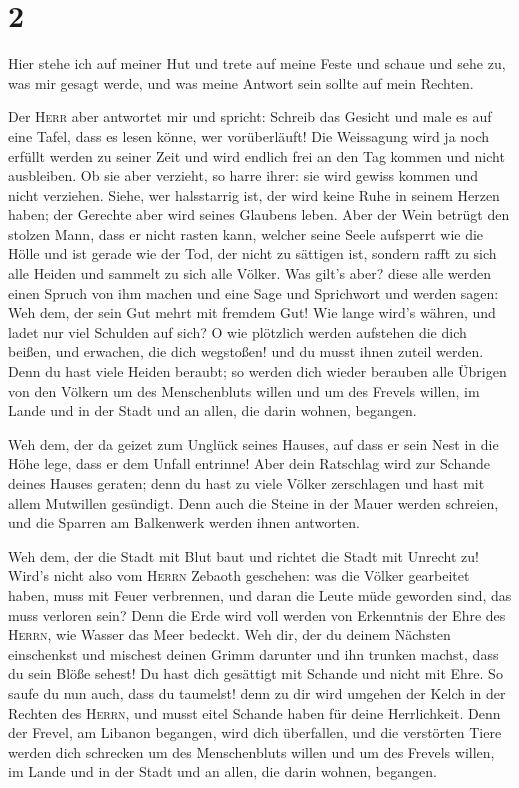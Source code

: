 \hypertarget{section-1}{%
\section{2}\label{section-1}}

 Hier stehe ich auf meiner Hut und trete auf meine Feste
und schaue und sehe zu, was mir gesagt werde, und was meine Antwort sein
sollte auf mein Rechten.

 Der \textsc{Herr} aber antwortet mir und spricht: Schreib
das Gesicht und male es auf eine Tafel, dass es lesen könne, wer
vorüberläuft!  Die Weissagung wird ja noch erfüllt werden
zu seiner Zeit und wird endlich frei an den Tag kommen und nicht
ausbleiben. Ob sie aber verzieht, so harre ihrer: sie wird gewiss kommen
und nicht verziehen.  Siehe, wer halsstarrig ist, der wird
keine Ruhe in seinem Herzen haben; der Gerechte aber wird seines
Glaubens leben.  Aber der Wein betrügt den stolzen Mann,
dass er nicht rasten kann, welcher seine Seele aufsperrt wie die Hölle
und ist gerade wie der Tod, der nicht zu sättigen ist, sondern rafft zu
sich alle Heiden und sammelt zu sich alle Völker.  Was
gilt's aber? diese alle werden einen Spruch von ihm machen und eine Sage
und Sprichwort und werden sagen: Weh dem, der sein Gut mehrt mit fremdem
Gut! Wie lange wird's währen, und ladet nur viel Schulden auf sich?
 O wie plötzlich werden aufstehen die dich beißen, und
erwachen, die dich wegstoßen! und du musst ihnen zuteil werden.
 Denn du hast viele Heiden beraubt; so werden dich wieder
berauben alle Übrigen von den Völkern um des Menschenbluts willen und um
des Frevels willen, im Lande und in der Stadt und an allen, die darin
wohnen, begangen.

 Weh dem, der da geizet zum Unglück seines Hauses, auf
dass er sein Nest in die Höhe lege, dass er dem Unfall entrinne!
 Aber dein Ratschlag wird zur Schande deines Hauses
geraten; denn du hast zu viele Völker zerschlagen und hast mit allem
Mutwillen gesündigt.  Denn auch die Steine in der Mauer
werden schreien, und die Sparren am Balkenwerk werden ihnen antworten.

 Weh dem, der die Stadt mit Blut baut und richtet die
Stadt mit Unrecht zu!  Wird's nicht also vom
\textsc{Herrn} Zebaoth geschehen: was die Völker gearbeitet haben, muss
mit Feuer verbrennen, und daran die Leute müde geworden sind, das muss
verloren sein?  Denn die Erde wird voll werden von
Erkenntnis der Ehre des \textsc{Herrn}, wie Wasser das Meer bedeckt.
 Weh dir, der du deinem Nächsten einschenkst und mischest
deinen Grimm darunter und ihn trunken machst, dass du sein Blöße sehest!
 Du hast dich gesättigt mit Schande und nicht mit Ehre.
So saufe du nun auch, dass du taumelst! denn zu dir wird umgehen der
Kelch in der Rechten des \textsc{Herrn}, und musst eitel Schande haben
für deine Herrlichkeit.  Denn der Frevel, am Libanon
begangen, wird dich überfallen, und die verstörten Tiere werden dich
schrecken um des Menschenbluts willen und um des Frevels willen, im
Lande und in der Stadt und an allen, die darin wohnen, begangen.

